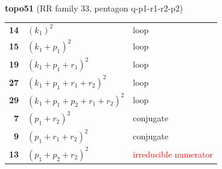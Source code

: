 \documentclass[10pt]{article}
\begin{document}
\begin{minipage}[t]{0.48\textwidth}
{}\\[2mm]\textbf{topo51} (RR family 33, pentagon q-p1-r1-r2-p2)\\[2pt]{\footnotesize\begin{tabular}{@{}r@{\ \ }l@{\ \ }l@{}}\textbf{14} & $(k_1)^2$ & loop\\
\textbf{15} & $(k_1+p_1)^2$ & loop\\
\textbf{19} & $(k_1+p_1+r_1)^2$ & loop\\
\textbf{27} & $(k_1+p_1+r_1+r_2)^2$ & loop\\
\textbf{29} & $(k_1+p_1+p_2+r_1+r_2)^2$ & loop\\
\textbf{7} & $(p_1+r_2)^2$ & conjugate\\
\textbf{9} & $(p_1+r_1+r_2)^2$ & conjugate\\
\textbf{13} & $(p_1+p_2+r_2)^2$ & \textcolor{red}{irreducible numerator}\\\end{tabular}}\end{minipage}\hfill%
\end{document}
